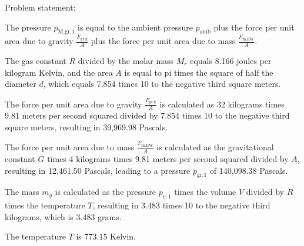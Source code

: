 Problem statement:

The pressure \( p_{\text{M,gr,1}} \) is equal to the ambient pressure \( p_{\text{amb}} \) plus the force per unit area due to gravity \( \frac{F_{\text{gr,k}}}{A} \) plus the force per unit area due to mass \( \frac{F_{\text{m,EW}}}{A} \).

The gas constant \( R \) divided by the molar mass \( M_r \) equals 8.166 joules per kilogram Kelvin, and the area \( A \) is equal to pi times the square of half the diameter \( d \), which equals 7.854 times 10 to the negative third square meters.

The force per unit area due to gravity \( \frac{F_{\text{gr,k}}}{A} \) is calculated as 32 kilograms times 9.81 meters per second squared divided by 7.854 times 10 to the negative third square meters, resulting in 39,969.98 Pascals.

The force per unit area due to mass \( \frac{F_{\text{m,EW}}}{A} \) is calculated as the gravitational constant \( G \) times 4 kilograms times 9.81 meters per second squared divided by \( A \), resulting in 12,461.50 Pascals, leading to a pressure \( p_{\text{gr,1}} \) of 140,098.38 Pascals.

The mass \( m_{g} \) is calculated as the pressure \( p_{v,1} \) times the volume \( V \) divided by \( R \) times the temperature \( T \), resulting in 3.483 times 10 to the negative third kilograms, which is 3.483 grams.

The temperature \( T \) is 773.15 Kelvin.